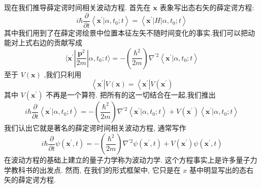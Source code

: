 现在我们推导薛定谔时间相关波动方程. 首先在 $\mathbf{x}$ 表象写出态右矢的薛定谔方程:
\begin{equation}
i\hbar \frac{\partial }{\partial t}\left\langle {{\mathbf{x}}^{\prime } | \alpha ,{t}_{0};t}\right\rangle = \left\langle {{\mathbf{x}}^{\prime }\left| H\right| \alpha ,{t}_{0};t}\right\rangle
\end{equation}
其中我们用到了在薛定谔绘景中位置本征左矢不随时间变化的事实.我们可以把动能对上式右边的贡献写成
\begin{equation}
\langle {{\mathbf{x}}^{\prime }| \frac{{\mathbf{p}}^{2}}{2m}| \alpha ,{t}_{0};t}\rangle = - \left( \frac{{\hbar }^{2}}{2m}\right) {\nabla }^{\prime 2}\left\langle {{\mathbf{x}}^{\prime } | \alpha ,{t}_{0};t}\right\rangle
\end{equation}
至于 $V\left( \mathbf{x}\right)$ ,我们只利用
\begin{equation}
\left\langle {\mathbf{x}}^{\prime }\right| V\left( \mathbf{x}\right) = \left\langle {\mathbf{x}}^{\prime }\right| V\left( {\mathbf{x}}^{\prime }\right)
\end{equation}
其中 $V\left( {\mathbf{x}}^{\prime }\right)$ 不再是一个算符. 把所有的这一切结合在一起,我们推出
\begin{equation}
i\hbar \frac{\partial }{\partial t}\left\langle {{\mathbf{x}}^{\prime } | \alpha ,{t}_{0};t}\right\rangle = - \left( \frac{{\hbar }^{2}}{2m}\right) {\nabla }^{\prime 2}\left\langle {{\mathbf{x}}^{\prime } | \alpha ,{t}_{0};t}\right\rangle + V\left( {\mathbf{x}}^{\prime }\right) \left\langle {{\mathbf{x}}^{\prime } | \alpha ,{t}_{0};t}\right\rangle
\end{equation}
我们认出它就是著名的薛定谔时间相关波动方程, 通常写作
\begin{equation}
i\hbar \frac{\partial }{\partial t}\psi \left( {{\mathbf{x}}^{\prime }, t}\right) = - \left( \frac{{\hbar }^{2}}{2m}\right) {\nabla }^{\prime 2}\psi \left( {{\mathbf{x}}^{\prime }, t}\right) + V\left( {\mathbf{x}}^{\prime }\right) \psi \left( {{\mathbf{x}}^{\prime }, t}\right)
\end{equation}
在波动方程的基础上建立的量子力学称为波动力学. 这个方程事实上是许多量子力学教科书的出发点. 然而, 在我们的形式框架中, 它只是在 $x$ 基中明显写出的态右矢的薛定谔方程.
